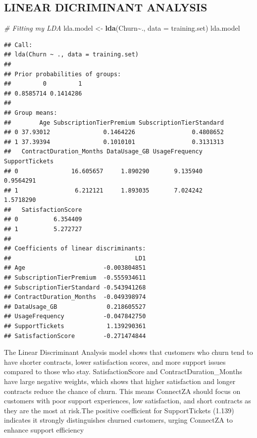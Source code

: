 \documentclass[
]{article}
\newenvironment{Shaded}{\begin{snugshade}}{\end{snugshade}}
\newcommand{\AttributeTok}[1]{\textcolor[rgb]{0.13,0.29,0.53}{#1}}
\newcommand{\CommentTok}[1]{\textcolor[rgb]{0.56,0.35,0.01}{\textit{#1}}}
\newcommand{\FunctionTok}[1]{\textcolor[rgb]{0.13,0.29,0.53}{\textbf{#1}}}
\newcommand{\NormalTok}[1]{#1}
\newcommand{\OtherTok}[1]{\textcolor[rgb]{0.56,0.35,0.01}{#1}}
\newcommand{\SpecialCharTok}[1]{\textcolor[rgb]{0.81,0.36,0.00}{\textbf{#1}}}
\begin{document}
\hypertarget{linear-dicriminant-analysis}{%
\subsection{LINEAR DICRIMINANT
ANALYSIS}\label{linear-dicriminant-analysis}}

\begin{Shaded}
\begin{Highlighting}[]
\CommentTok{\# Fitting my  LDA}
\NormalTok{lda.model }\OtherTok{\textless{}{-}} \FunctionTok{lda}\NormalTok{(Churn}\SpecialCharTok{\textasciitilde{}}\NormalTok{., }\AttributeTok{data =}\NormalTok{ training.set)}
\NormalTok{lda.model}
\end{Highlighting}
\end{Shaded}

\begin{verbatim}
## Call:
## lda(Churn ~ ., data = training.set)
## 
## Prior probabilities of groups:
##         0         1 
## 0.8585714 0.1414286 
## 
## Group means:
##        Age SubscriptionTierPremium SubscriptionTierStandard
## 0 37.93012               0.1464226                0.4808652
## 1 37.39394               0.1010101                0.3131313
##   ContractDuration_Months DataUsage_GB UsageFrequency SupportTickets
## 0               16.605657     1.890290       9.135940      0.9564291
## 1                6.212121     1.893035       7.024242      1.5718290
##   SatisfactionScore
## 0          6.354409
## 1          5.272727
## 
## Coefficients of linear discriminants:
##                                   LD1
## Age                      -0.003804851
## SubscriptionTierPremium  -0.555934611
## SubscriptionTierStandard -0.543941268
## ContractDuration_Months  -0.049398974
## DataUsage_GB              0.218605527
## UsageFrequency           -0.047842750
## SupportTickets            1.139290361
## SatisfactionScore        -0.271474844
\end{verbatim}

\hfill\break
The Linear Discriminant Analysis model shows that customers who churn
tend to have shorter contracts, lower satisfaction scores, and more
support issues compared to those who stay. SatisfactionScore and
ContractDuration\_Months have large negative weights, which shows that
higher satisfaction and longer contracts reduce the chance of churn.
This means ConnectZA should focus on customers with poor support
experiences, low satisfaction, and short contracts as they are the most
at risk.The positive coefficient for SupportTickets (1.139) indicates it
strongly distinguishes churned customers, urging ConnectZA to enhance
support efficiency\\
\end{document}
